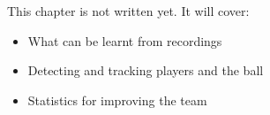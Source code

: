 \label{ch:va1}
\begin{keyidea}
This chapter is not written yet. It will cover:
\begin{itemize}[nosep]
  \item What can be learnt from recordings
  \item Detecting and tracking players and the ball
  \item Statistics for improving the team
\end{itemize}
\end{keyidea}
